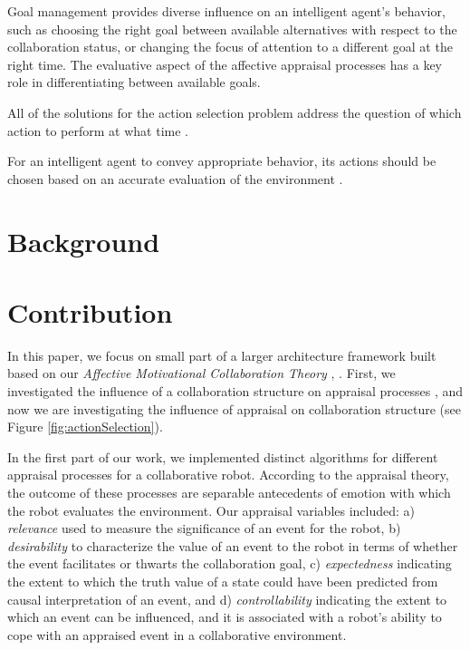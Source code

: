 \documentclass[conference]{IEEEtran}
\begin{document}
Goal management provides diverse influence on an intelligent agent's behavior,
such as choosing the right goal between available alternatives with respect to
the collaboration status, or changing the focus of attention to a different goal
at the right time. The evaluative aspect of the affective appraisal processes
has a key role in differentiating between available goals.

All of the solutions for the action selection problem address the question of
which action to perform at what time \cite{tyrrell:action-selection}.

\cite{scheutz:architectural-action-selection}

For an intelligent agent to convey appropriate behavior, its actions should be
chosen based on an accurate evaluation of the environment
\cite{franklin:artificial-minds}.

\section{Background}

\section{Contribution}

In this paper, we focus on small part of a larger architecture framework
built based on our \textit{Affective Motivational Collaboration Theory}
\cite{shayganfar:amct-symbiotic}, \cite{shayganfar:emotional-awareness}. First,
we investigated the influence of a collaboration structure on appraisal
processes \cite{shayganfar:appraisal}, and now we are investigating the
influence of appraisal on collaboration structure (see Figure
\ref{fig:actionSelection}).

In the first part of our work, we implemented distinct algorithms for different
appraisal processes for a collaborative robot. According to the appraisal
theory, the outcome of these processes are separable antecedents of emotion with
which the robot evaluates the environment. Our appraisal variables included: a)
\textit{relevance} used to measure the significance of an event for the robot,
b) \textit{desirability} to characterize the value of an event to the robot
in terms of whether the event facilitates or thwarts the collaboration goal, c)
\textit{expectedness} indicating the extent to which the truth value of a state
could have been predicted from causal interpretation of an event, and d)
\textit{controllability} indicating the extent to which an event can be
influenced, and it is associated with a robot's ability to cope with an
appraised event in a collaborative environment.
\end{document}

